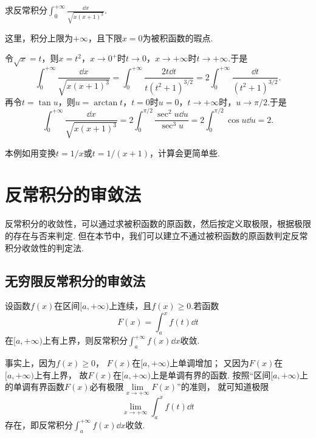 \begin{example}
求反常积分\(\int_0^{+\infty} \frac{\dd{x}}{\sqrt{x(x+1)^3}}\).
\begin{solution}
这里，积分上限为\(+\infty\)，且下限\(x=0\)为被积函数的瑕点.

令\(\sqrt{x} = t\)，则\(x = t^2\)，\(x\to0^+\)时\(t\to0\)，\(x\to+\infty\)时\(t\to+\infty\).于是\[
\int_0^{+\infty} \frac{\dd{x}}{\sqrt{x(x+1)^3}}
= \int_0^{+\infty} \frac{2t\dd{t}}{t(t^2+1)^{3/2}}
= 2 \int_0^{+\infty} \frac{\dd{t}}{(t^2+1)^{3/2}}.
\]
再令\(t = \tan u\)，则\(u = \arctan t\)，\(t=0\)时\(u=0\)，\(t\to+\infty\)时，\(u\to\pi/2\).于是\[
\int_0^{+\infty} \frac{\dd{x}}{\sqrt{x(x+1)^3}}
= 2 \int_0^{\pi/2} \frac{\sec^2 u \dd{u}}{\sec^3 u}
= 2 \int_0^{\pi/2} \cos u \dd{u}
= 2.
\]
\end{solution}
本例如用变换\(t = 1/x\)或\(t = 1/(x+1)\)，计算会更简单些.
\end{example}

\section{反常积分的审敛法}
反常积分的收敛性，可以通过求被积函数的原函数，然后按定义取极限，根据极限的存在与否来判定.
但在本节中，我们可以建立不通过被积函数的原函数判定反常积分收敛性的判定法.

\subsection{无穷限反常积分的审敛法}
\begin{theorem}\label{theorem:定积分.无穷限反常积分的审敛法引理}
设函数\(f(x)\)在区间\([a,+\infty)\)上连续，且\(f(x) \geqslant 0\).若函数\[
F(x)=\int_a^x f(t) \dd{t}
\]在\([a,+\infty)\)上有上界，则反常积分\(\int_a^{+\infty} f(x) \dd{x}\)收敛.
\end{theorem}
事实上，因为\(f(x)\geqslant0\)，
\(F(x)\)在\([a,+\infty)\)上单调增加；
又因为\(F(x)\)在\([a,+\infty)\)上有上界，
故\(F(x)\)在\([a,+\infty)\)上是单调有界的函数.
按照“区间\([a,+\infty)\)上的单调有界函数\(F(x)\)必有极限\(\lim\limits_{x\to+\infty} F(x)\)”的准则，
就可知道极限\[
	\lim\limits_{x\to+\infty} \int_a^x f(t) \dd{t}
\]存在，即反常积分\(\int_a^{+\infty} f(x) \dd{x}\)收敛.

